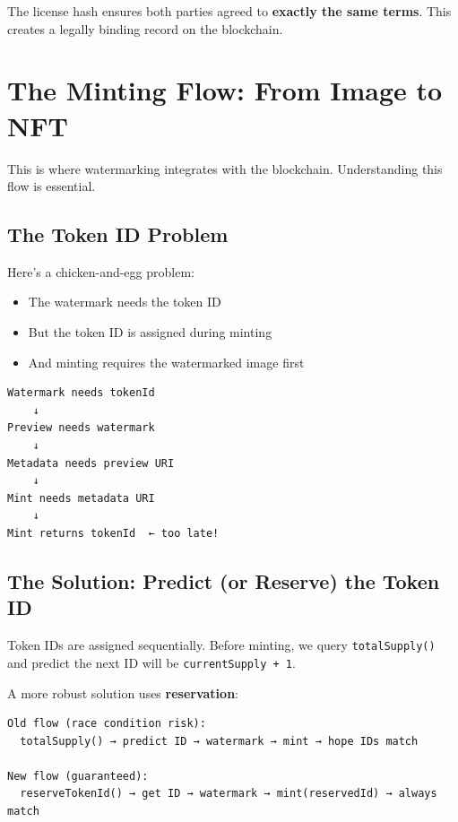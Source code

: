 \documentclass[11pt,a4paper]{article}
\newcommand{\code}[1]{\texttt{#1}}
\begin{document}
The license hash ensures both parties agreed to \textbf{exactly the same terms}. This creates a legally binding record on the blockchain.

\newpage
\section{The Minting Flow: From Image to NFT}

This is where watermarking integrates with the blockchain. Understanding this flow is essential.

\subsection{The Token ID Problem}

Here's a chicken-and-egg problem:
\begin{itemize}
    \item The watermark needs the token ID
    \item But the token ID is assigned during minting
    \item And minting requires the watermarked image first
\end{itemize}

\begin{mdframed}[style=codeblock]
\begin{verbatim}
Watermark needs tokenId
    ↓
Preview needs watermark
    ↓
Metadata needs preview URI
    ↓
Mint needs metadata URI
    ↓
Mint returns tokenId  ← too late!
\end{verbatim}
\end{mdframed}

\subsection{The Solution: Predict (or Reserve) the Token ID}

Token IDs are assigned sequentially. Before minting, we query \code{totalSupply()} and predict the next ID will be \code{currentSupply + 1}.

A more robust solution uses \textbf{reservation}:

\begin{mdframed}[style=codeblock]
\begin{verbatim}
Old flow (race condition risk):
  totalSupply() → predict ID → watermark → mint → hope IDs match

New flow (guaranteed):
  reserveTokenId() → get ID → watermark → mint(reservedId) → always match
\end{verbatim}
\end{mdframed}
\end{document}
